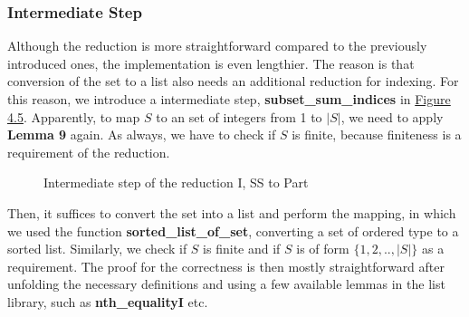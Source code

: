 \subsubsection*{Intermediate Step}
Although the reduction is more straightforward compared to the previously introduced ones, the implementation is even lengthier. 
The reason is that conversion of the set to a list also needs an additional reduction for indexing. For this reason, we introduce 
a intermediate step, \textbf{subset\_sum\_indices} in \hyperref[fig:4.5]{Figure 4.5}.
Apparently, to map $S$ to an set of integers from 1 to $|S|$, we need to apply \textbf{Lemma 9} again. 
As always, we have to check if $S$ is finite, because finiteness is a requirement of the reduction.
\begin{figure}[!h]
    \caption{Intermediate step of the reduction I, SS to Part}
    \label{fig:4.6}
\end{figure}
Then, it suffices to convert the set into a list and perform the mapping, in which we used the function 
\textbf{sorted\_list\_of\_set}, converting a set of ordered type to a sorted list. Similarly, we check if 
$S$ is finite and if $S$ is of form $\{1, 2, .. , |S|\}$ as a requirement. The proof for the correctness is then mostly straightforward
after unfolding the necessary definitions and using a few available lemmas in the list library, such as \textbf{nth\_equalityI} etc. 

